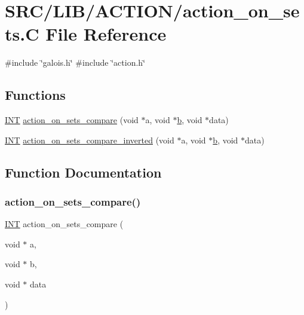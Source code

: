 \hypertarget{action__on__sets_8_c}{}\section{S\+R\+C/\+L\+I\+B/\+A\+C\+T\+I\+O\+N/action\+\_\+on\+\_\+sets.C File Reference}
\label{action__on__sets_8_c}
{\ttfamily \#include \char`\"{}galois.\+h\char`\"{}}\newline
{\ttfamily \#include \char`\"{}action.\+h\char`\"{}}\newline
\subsection*{Functions}
\begin{DoxyCompactItemize}
\item 
\mbox{\hyperlink{galois_8h_a09fddde158a3a20bd2dcadb609de11dc}{I\+NT}} \mbox{\hyperlink{action__on__sets_8_c_a8922c03da1cf508fa89458e7a0db1274}{action\+\_\+on\+\_\+sets\+\_\+compare}} (void $\ast$a, void $\ast$\mbox{\hyperlink{alphabet2_8_c_a148e3876077787926724625411d6e7a9}{b}}, void $\ast$data)
\item 
\mbox{\hyperlink{galois_8h_a09fddde158a3a20bd2dcadb609de11dc}{I\+NT}} \mbox{\hyperlink{action__on__sets_8_c_ae0e1638911c666f284888f2462f655eb}{action\+\_\+on\+\_\+sets\+\_\+compare\+\_\+inverted}} (void $\ast$a, void $\ast$\mbox{\hyperlink{alphabet2_8_c_a148e3876077787926724625411d6e7a9}{b}}, void $\ast$data)
\end{DoxyCompactItemize}


\subsection{Function Documentation}
\mbox{\label{action__on__sets_8_c_a8922c03da1cf508fa89458e7a0db1274}} 
\subsubsection{\texorpdfstring{action\+\_\+on\+\_\+sets\+\_\+compare()}{action\_on\_sets\_compare()}}
{\footnotesize\ttfamily \mbox{\hyperlink{galois_8h_a09fddde158a3a20bd2dcadb609de11dc}{I\+NT}} action\+\_\+on\+\_\+sets\+\_\+compare (\begin{DoxyParamCaption}\item[{void $\ast$}]{a,  }\item[{void $\ast$}]{b,  }\item[{void $\ast$}]{data }\end{DoxyParamCaption})}


